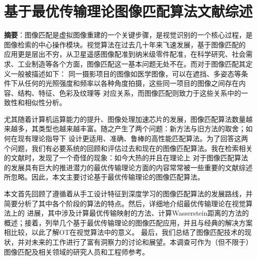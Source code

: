 \maketitle%
\intobmk\section*{基于最优传输理论图像匹配算法文献综述}%

\vspace*{10pt}
   
\thispagestyle{plain}
\setcounter{page}{1}%

\noindent
\textbf{摘要}：图像匹配是虚拟图像重建的一个关键步骤，是视觉识别的一个核心过程，是图像检索的中心操作模块。视觉算法在过去几十年来飞速发展，基于图像匹配的
应用更是层出不穷，从卫星遥感图像配准到纳米级零件配准，在科学研究、社会需求、工业制造等各个方面，图像匹配这一基本问题无处不在。而对于图像匹配其定义一般被描述如下：
同一摄影项目的图像如医学图像，可以在遮挡、多姿态等条件下从任何的光照强度和频率以各种角度拍摄，这些同一项目的图像之间存在内容、结构、特征、色彩及纹理等
对应关系，而图像匹配则致力于这些关系中的一致性和相似性分析。

尤其随着计算机运算能力的提升、图像处理加速芯片的发展，图像匹配算法数量越来越多，其类型也越来越丰富。随之产生了两个问题：新方法与旧方法的取舍；如何在现有理论指导下
设计更适用、准确、鲁棒的高性能匹配算法。为了回答这两个问题，我们有必要系统的回顾和评估过去和现在的图像匹配算法。我在检索相关的文献时，发现了一个奇怪的现象：如今大热的并且在理论上
对于图像匹配算法的发展具有巨大的推进潜力的最优传输理论方面的内容常常被一些重要的文献综述\cite{ma2021image}所忽略。因此，本文主要讨论基于最优传输理论的图像匹配算法。

本文首先回顾了遵循着从手工设计特征到深度学习的图像匹配算法的发展路线，并简要分析了其中各个阶段的算法的特点。然后，详细地介绍最优传输理论在视觉算法上的
进展，其中涉及计算最优传输映射的方法、计算Wasserstein距离的方法的概述；接着，列举几个基于最优传输理论的图像匹配应用，并且与经典的解决方案相比较，以此了解OT在视觉算法中的意义。
最后，我们总结了图像匹配技术的现状，并对未来的工作进行了富有洞察力的讨论和展望。本调查可作为（但不限于）图像匹配及相关领域的研究人员和工程师参考。


